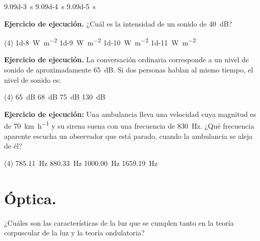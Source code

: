 \documentclass[12pt, letter]{exam}
\begin{document}
\begin{questions}
\begin{tasks}
       \task \SI{9.09d-3}{\second}
       \task \SI{9.09d-4}{\second}
       \task \SI{9.09d-5}{\second}
    \end{tasks}
   \question \textbf{Ejercicio de ejecución.} ¿Cuál es la intensidad de un sonido de \SI{40}{\dB}?
   \begin{tasks}(4)
       \task \SI{1d-8}{\watt\per\square\meter}
       \task \SI{1d-9}{\watt\per\square\meter}
       \task \SI{1d-10}{\watt\per\square\meter}
       \task \SI{1d-11}{\watt\per\square\meter}
   \end{tasks}
   \question \textbf{Ejercicio de ejecución.} La conversación ordinaria corresponde a un nivel de sonido de aproximadamente \SI{65}{\dB}. Si dos personas hablan al mismo tiempo, el nivel de sonido es:
   \begin{tasks}(4)
       \task \SI{65}{\dB}
       \task \SI{68}{\dB}
       \task \SI{75}{\dB}
       \task \SI{130}{\dB}
   \end{tasks}
   \question \textbf{Ejercicio de ejecución: } Una ambulancia lleva una velocidad cuya magnitud es de \SI{70}{\kilo\meter\per\hour} y su sirena suena con una frecuencia de \SI{830}{\hertz}. ¿Qué frecuencia aparente escucha un observador que está parado, cuando la ambulancia se aleja de él?
   \begin{tasks}(4)
    \task \SI{785.11}{\hertz}
    \task \SI{880.33}{\hertz}
    \task \SI{1000.00}{\hertz}
    \task \SI{1659.19}{\hertz}
\end{tasks}

    \section{Óptica.}

    \question ¿Cuáles son las características de la luz que se cumplen tanto en la teoría corpuscular de la luz y la teoría ondulatoria?
\end{questions}
\end{document}
